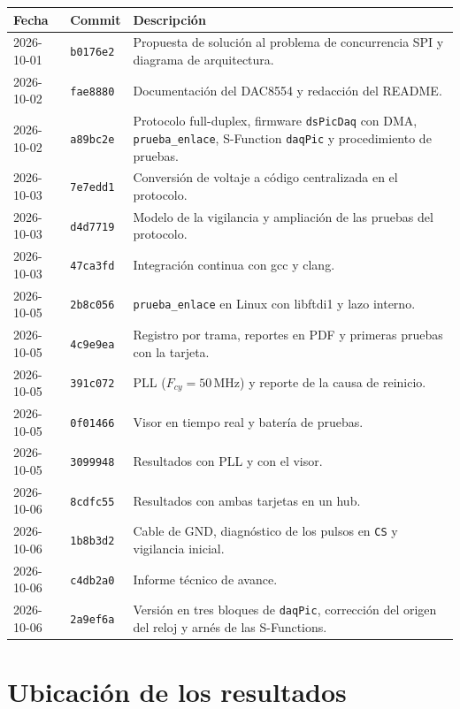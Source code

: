\documentclass[11pt]{article}
\newcommand{\code}[1]{\texttt{#1}}
\begin{document}
\begin{longtable}{@{}llp{10.2cm}@{}}
\toprule
Fecha & Commit & Descripción \\
\midrule
\endhead
2026-10-01 & \code{b0176e2} & Propuesta de solución al problema de concurrencia SPI y diagrama de arquitectura. \\
2026-10-02 & \code{fae8880} & Documentación del DAC8554 y redacción del README. \\
2026-10-02 & \code{a89bc2e} & Protocolo full-duplex, firmware \code{dsPicDaq} con DMA, \code{prueba\_enlace}, S-Function \code{daqPic} y procedimiento de pruebas. \\
2026-10-03 & \code{7e7edd1} & Conversión de voltaje a código centralizada en el protocolo. \\
2026-10-03 & \code{d4d7719} & Modelo de la vigilancia y ampliación de las pruebas del protocolo. \\
2026-10-03 & \code{47ca3fd} & Integración continua con gcc y clang. \\
2026-10-05 & \code{2b8c056} & \code{prueba\_enlace} en Linux con libftdi1 y lazo interno. \\
2026-10-05 & \code{4c9e9ea} & Registro por trama, reportes en PDF y primeras pruebas con la tarjeta. \\
2026-10-05 & \code{391c072} & PLL ($F_{cy} = 50$\,MHz) y reporte de la causa de reinicio. \\
2026-10-05 & \code{0f01466} & Visor en tiempo real y batería de pruebas. \\
2026-10-05 & \code{3099948} & Resultados con PLL y con el visor. \\
2026-10-06 & \code{8cdfc55} & Resultados con ambas tarjetas en un hub. \\
2026-10-06 & \code{1b8b3d2} & Cable de GND, diagnóstico de los pulsos en \code{CS} y vigilancia inicial. \\
2026-10-06 & \code{c4db2a0} & Informe técnico de avance. \\
2026-10-06 & \code{2a9ef6a} & Versión en tres bloques de \code{daqPic}, corrección del origen del reloj y arnés de las S-Functions. \\
\bottomrule
\end{longtable}

\section{Ubicación de los resultados}
\end{document}
